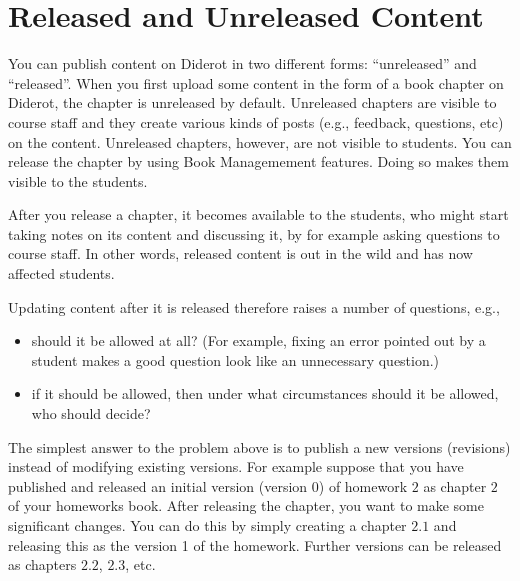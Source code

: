 
 


\section{Released and Unreleased Content}
\label{sec:publish::released-unreleased}

You can publish content on Diderot in two different forms: ``unreleased'' and ``released''.
%
When you first upload some content in the form of a book chapter on Diderot, the chapter is unreleased by default.
%
Unreleased chapters are visible to course staff and they create various kinds of posts (e.g., feedback, questions, etc) on the content.
%
Unreleased chapters, however, are not visible to students.
%
You can release the chapter by using Book Managemement features. 
%
Doing so makes them visible to the students.
%

\begin{gram}
\label{grm:publish::released::user-implications}
After you release a chapter, it becomes available to the students, who might start taking notes on its content and discussing it, by for example asking questions to course staff.
%
In other words, released content is out in the wild and has now affected students.
%

Updating content after it is released  therefore raises a number of questions, e.g.,
\begin{itemize}
\item should it be allowed at all? (For example, fixing an error pointed out by a student makes a good question look like an unnecessary question.)

\item if it should be allowed, then under what circumstances should it be allowed, who should decide?
\end{itemize}
\end{gram}

\begin{gram}[Versioning]
The simplest answer to the problem above is to publish a new versions (revisions) instead of modifying existing versions.
%
For example suppose that you have published and released an initial version (version 0) of homework $2$ as chapter $2$ of your homeworks book.
%
After releasing the chapter, you want to make some significant changes.  You can  do this by simply creating a chapter $2.1$ and releasing this as the version 1 of the homework.
%
Further versions can be released as chapters $2.2$, $2.3$, etc.

\end{gram}

